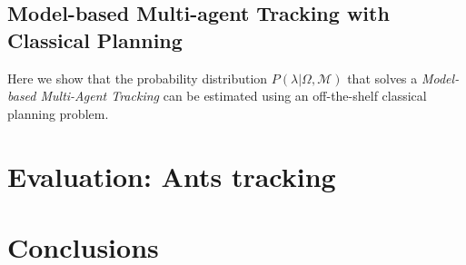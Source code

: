 \documentclass[letterpaper]{article} %
\begin{document}
\subsection{Model-based Multi-agent Tracking with Classical Planning}
Here we show that the probability distribution $P(\lambda|\Omega,\mathcal{M})$ that solves a {\em Model-based Multi-Agent Tracking} can be estimated using an off-the-shelf classical planning problem.


\section{Evaluation: Ants tracking}
\label{sec:evaluation}




\section{Conclusions}
\label{sec:conclusions}



\end{document}
